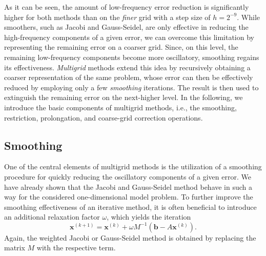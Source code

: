 As it can be seen, the amount of low-frequency error reduction is significantly higher for both methods than on the \emph{finer} grid with a step size of $h = 2^{-9}$.
While smoothers, such as Jacobi and Gauss-Seidel, are only effective in reducing the high-frequency components of a given error, we can overcome this limitation by representing the remaining error on a coarser grid.
Since, on this level, the remaining low-frequency components become more oscillatory, smoothing regains its effectiveness. 
\emph{Multigrid} methods extend this idea by recursively obtaining a coarser representation of the same problem, whose error can then be effectively reduced by employing only a few \emph{smoothing} iterations.
The result is then used to extinguish the remaining error on the next-higher level.
In the following, we introduce the basic components of multigrid methods, i.e., the smoothing, restriction, prolongation, and coarse-grid correction operations.
\subsection{Smoothing}
\label{sec:smoothing}
One of the central elements of multigrid methods is the utilization of a smoothing procedure for quickly reducing the oscillatory components of a given error.
We have already shown that the Jacobi and Gauss-Seidel method behave in such a way for the considered one-dimensional model problem.
To further improve the smoothing effectiveness of an iterative method, it is often beneficial to introduce an additional relaxation factor $\omega$, which yields the iteration 
\begin{equation}
	\bm{x}^{(k+1)} = \bm{x}^{(k)} + \omega M^{-1}(\bm b - A \bm{x}^{(k)}).
	\label{eq:general-weighted-stationary-iterative-method}
\end{equation}
Again, the weighted Jacobi or Gauss-Seidel method is obtained by replacing the matrix $M$ with the respective term.

